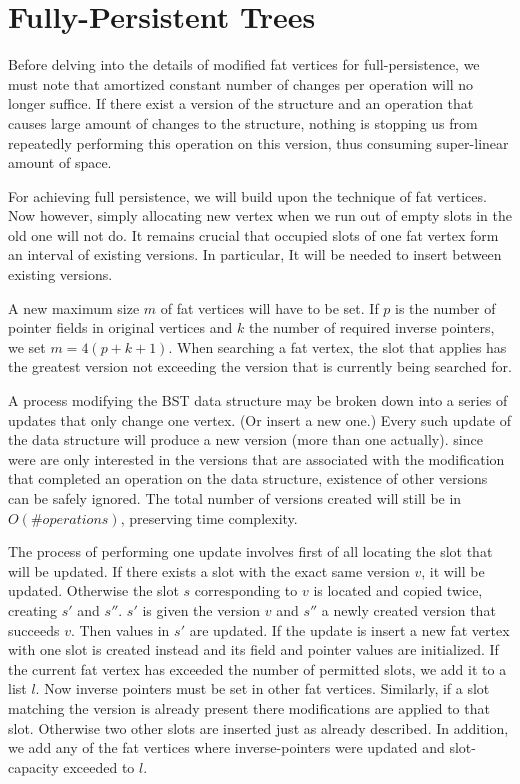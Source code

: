 \section{Fully-Persistent Trees}

Before delving into the details of modified fat vertices for full-persistence, we must note that amortized constant number of changes per operation will no longer suffice. If there exist a version of the structure and an operation that causes large amount of changes to the structure, nothing is stopping us from repeatedly performing this operation on this version, thus consuming super-linear amount of space.

For achieving full persistence, we will build upon the technique of fat vertices. Now however, simply allocating new vertex when we run out of empty slots in the old one will not do. It remains crucial that occupied slots of one fat vertex form an interval of existing versions. In particular, It will be needed to insert between existing versions.

A new maximum size $m$ of fat vertices will have to be set. If $p$ is the number of pointer fields in original vertices and $k$ the number of required inverse pointers, we set $m = 4(p+k+1)$.
When searching a fat vertex, the slot that applies has the greatest version not exceeding the version that is currently being searched for.


A process modifying the BST data structure may be broken down into a series of updates that only change one vertex. (Or insert a new one.)
Every such update of the data structure will produce a new version (more than one actually). since were are only interested in the versions that are associated with the modification that completed an operation on the data structure, existence of other versions can be safely ignored. The total number of versions created will still be in $O(\# operations)$, preserving time complexity.

The process of performing one update involves first of all locating the slot that will be updated. If there exists a slot with the exact same version $v$, it will be updated. Otherwise the slot $s$ corresponding to $v$ is located and copied twice, creating $s'$ and $s''$. $s'$ is given the version $v$ and $s''$ a newly created version that succeeds $v$. Then values in $s'$ are updated.
If the update is insert a new fat vertex with one slot is created instead and its field and pointer values are initialized.
If the current fat vertex has exceeded the number of permitted slots, we add it to a list $l$.
Now inverse pointers must be set in other fat vertices. Similarly, if a slot matching the version is already present there modifications are applied to that slot. Otherwise two other slots are inserted just as already described. In addition, we add any of the fat vertices where inverse-pointers were updated and slot-capacity exceeded to $l$.


